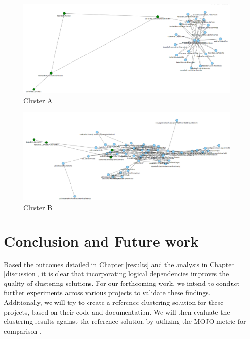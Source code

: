 \documentclass[conference]{IEEEtran}
\begin{document}
\begin{figure}
\centering
\includegraphics[width=\columnwidth]{cluster1.png}
\caption{Cluster A}
\label{fig:clusterA}
\centering
\end{figure}


\begin{figure}
\centering
\includegraphics[width=\columnwidth]{cluster2.png}
\caption{Cluster B}
\label{fig:clusterB}
\centering
\end{figure}




\section{Conclusion and Future work}

Based the outcomes detailed in Chapter \ref{results} and the analysis in Chapter \ref{discussion}, it is clear that incorporating logical dependencies improves the quality of clustering solutions. For our forthcoming work, we intend to conduct further experiments across various projects to validate these findings. Additionally, we will try to create a reference clustering solution for these projects, based on their code and documentation. We will then evaluate the clustering results against the reference solution by utilizing the MOJO metric for comparison \cite{mojo-tzerpos}.




\end{document}
